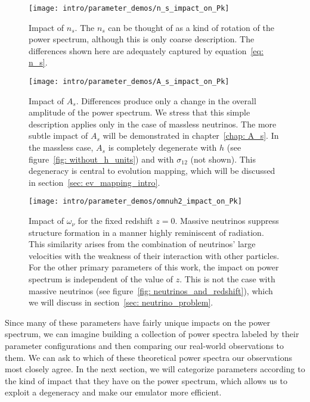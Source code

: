 
\begin{figure}[ht!]
  \centering
  \texttt{[image: intro/parameter\_demos/n\_s\_impact\_on\_Pk]}
  \caption[Impact of $n_s$ on $P(k)$]{Impact of $n_s$. The $n_s$ can be
  thought of as a kind of rotation of the power spectrum, although this
  is only coarse description. The differences shown here are
  adequately captured by equation~\ref{eq: n_s}.}
  \label{fig: n_s_dependence}
\end{figure}

\begin{figure}[ht!]
  \centering
  \texttt{[image: intro/parameter\_demos/A\_s\_impact\_on\_Pk]}
  \caption[Impact of $A_s$ on $P(k)$]{Impact of $A_s$. Differences produce
  	only a change in the overall amplitude of the power spectrum. We stress
  	that this simple description applies only in the case of massless
  	neutrinos. The more subtle impact of $A_s$ will be demonstrated in
  	chapter~\ref{chap: A_s}. In the massless case, $A_s$ is completely
  	degenerate with $h$ (see figure~\ref{fig: without_h_units}) and with
  	$\sigma_{12}$ (not shown). This degeneracy is central to evolution
  	mapping, which will be discussed in section~\ref{sec: ev_mapping_intro}.}
  \label{fig: A_s_dependence}
\end{figure}

\begin{figure}[ht!]
  \centering
  \texttt{[image: intro/parameter\_demos/omnuh2\_impact\_on\_Pk]}
  \caption[Impact of $\omega_\nu$ on $P(k)$]{Impact of $\omega_\nu$ for the
  	fixed redshift $z=0$. Massive neutrinos suppress structure formation in
  	a manner highly reminiscent of radiation. This similarity arises from the
  	combination of neutrinos' large velocities with the weakness of their 
  	interaction with other particles.
  	For the other primary parameters of this work,
  	the impact on power spectrum is independent of the value of $z$. This is
  	not the case with massive neutrinos
  	(see figure~\ref{fig: neutrinos_and_redshift}), which we will discuss in
  	section~\ref{sec: neutrino_problem}.}
  \label{fig: omega_nu_dependence}
\end{figure}


Since many of these parameters have fairly unique impacts on the power 
spectrum, we can imagine building a collection of power spectra labeled by
their parameter configurations and then comparing our real-world observations 
to them. We can ask to which of these theoretical power spectra our 
observations most closely agree.
In the next section, we will categorize parameters according to the
kind of impact that they have on the power spectrum, which allows us to
exploit a degeneracy and make our emulator more efficient. 

